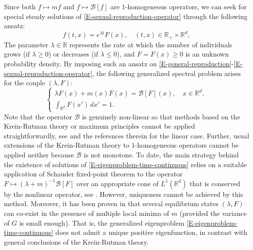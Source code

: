 \documentclass[reqno]{amsart}
\numberwithin{equation}{section}
\begin{document}
{Since both $f\mapsto m f$ and $f\mapsto \mathcal{B}[f]$ are $1$-homogeneous operators, we can seek for special steady solutions of \eqref{E-sexual-reproduction-operator} through the following ansatz:
\begin{equation}\label{E-ansatz}
f(t,x)=e^{\lambda t}F(x),\quad (t,x)\in\mathbb{R}_+\times \mathbb{R}^d,
\end{equation}
The parameter $\lambda\in \mathbb{R}$ represents the rate at which the number of individuals grows (if $\lambda\geq 0$) or decreases (if $\lambda\leq 0$), and $F=F(x)\geq 0$ is an unknown probability density. By imposing such an ansatz on \eqref{E-general-reproduction}-\eqref{E-sexual-reproduction-operator}, the following generalized spectral problem arises for the couple $(\lambda,F)$:
\begin{equation}\label{E-eigenproblem-time-continuous}
\left\{\begin{array}{l}
\lambda F(x)+m(x)F(x)=\mathcal{B}[F](x),\quad x\in \mathbb{R}^d,\\
\int_{\mathbb{R}^d}F(x')\,dx'=1.
\end{array}\right.
\end{equation}
Note that the operator $\mathcal{B}$ is genuinely non-linear so that methods based on the Krein-Rutman theory or maximum principles cannot be applied straightforwardly, see \cite{BCV-16, CLW-17} and the references therein for the linear case. Further, usual extensions of the Krein-Rutman theory to $1$-homogeneous operators \cite{M-07} cannot be applied neither because $\mathcal{B}$ is not monotone. To date, the main strategy behind the existence of solutions of \eqref{E-eigenproblem-time-continuous} relies on a suitable application of Schauder fixed-point theorem to the operator $F\mapsto (\lambda+m)^{-1}\mathcal{B}[F]$ over an appropriate cone of $L^1(\mathbb{R}^d)$ that is conserved by the nonlinear operator, see \cite{BCGL-17-arxiv}. However, uniqueness cannot be achieved by this method. Moreover, it has been proven in \cite[Corollary 1.5]{CGP-19} that several equilibrium states $(\lambda,F)$ can co-exist in the presence of multiple local minima of $m$ (provided the variance of $G$ is small enough). That is, the generalized eigenproblem \eqref{E-eigenproblem-time-continuous} does not admit a unique positive eigenfunction, in contrast with general conclusions of the Krein-Rutman theory. 

}
\end{document}
